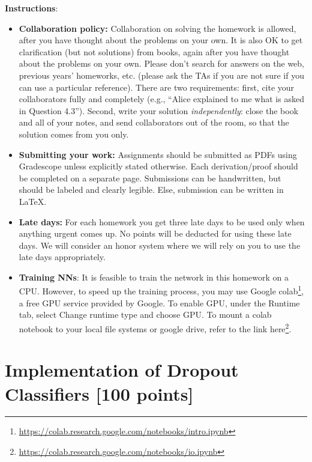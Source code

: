 \documentclass{article}
\begin{document}
\textbf{\large Instructions}:
\begin{itemize}
    \item \textbf{Collaboration policy:} Collaboration on solving the homework is allowed, after you have thought about the problems on your own. It is also OK to get clarification (but not solutions) from books, again after you have thought about the problems on your own. Please don’t search for answers on the web, previous years’ homeworks, etc. (please ask the TAs if you are not sure if you can use a particular reference). There are two requirements: first, cite your collaborators fully and completely (e.g., ``Alice explained to me what is asked in Question 4.3''). Second, write your solution \emph{independently}: close the book and all of your notes, and send collaborators out of the room, so that the solution comes from you only. 
    \item \textbf{Submitting your work:} Assignments should be submitted as PDFs using Gradescope unless explicitly stated otherwise. Each derivation/proof should be completed on a separate page. Submissions can be handwritten, but should be labeled and clearly legible. Else, submission can be written in LaTeX.
    
    \item \textbf{Late days:} For each homework you get three late days to be used only when anything urgent comes up. No points will be deducted for using these late days. We will consider an honor system where we will rely on you to use the late days appropriately.
    
    \item \textbf{Training NNs}: It is feasible to train the network in this homework on a CPU. However, to speed up the training process, you may use Google colab\footnote{\url{https://colab.research.google.com/notebooks/intro.ipynb}}, a free GPU service provided by Google. To enable GPU, under the Runtime tab, select Change runtime type and choose GPU. To mount a colab notebook to your local file systems or google drive, refer to the link here\footnote{\url{https://colab.research.google.com/notebooks/io.ipynb}}.
    

\end{itemize}

\newpage

\section{Implementation of Dropout Classifiers [100 points]}
\label{prb:hw6::prob2}
\end{document}
